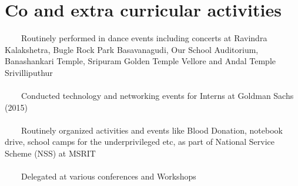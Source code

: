 \documentclass[a4paper,10pt]{article} %
\newcommand{\tabitem}{~~\llap{\textbullet}~~}
\begin{document}

\section{Co and extra curricular activities}
\tabitem Routinely performed in dance events including concerts at Ravindra 
Kalakshetra, Bugle Rock Park Basavanagudi, Our School Auditorium, Banashankari 
Temple, Sripuram Golden Temple Vellore and Andal Temple Srivilliputhur\\
\\
\tabitem Conducted technology and networking events for Interns at Goldman 
Sachs (2015)\\
\\
\tabitem Routinely organized activities and events like Blood Donation, 
notebook drive, school camps for the underprivileged etc, as part of National 
Service Scheme (NSS) at MSRIT\\
\\ 
\tabitem Delegated at various conferences and Workshops\\


\end{document}
